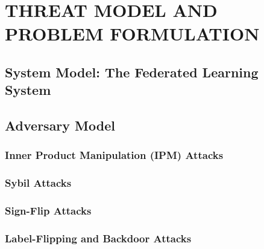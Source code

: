 \documentclass[../main]{subfiles}
\begin{document}
\chapter{THREAT MODEL AND PROBLEM FORMULATION}
\label{ch:threat_model}

\section{System Model: The Federated Learning System}
\label{sec:sys_model}


\section{Adversary Model}
\label{sec:adv_model}


\subsection{Inner Product Manipulation (IPM) Attacks}
\label{sec:ipm}


\subsection{Sybil Attacks}
\label{sec:sybil}


\subsection{Sign-Flip Attacks}
\label{sec:sign_flip}


\subsection{Label-Flipping and Backdoor Attacks}
\label{sec:label_flip}

\end{document}
